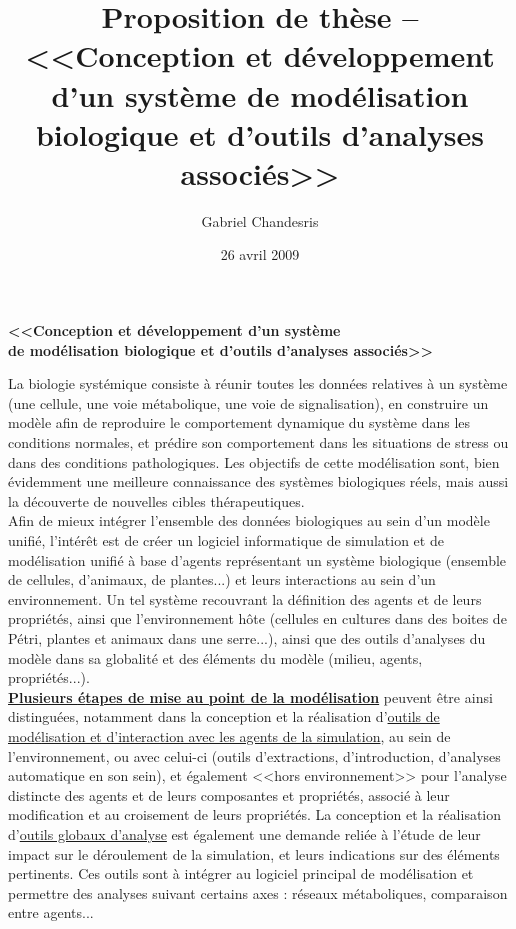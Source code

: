 \documentclass[11pt,twoside,a4paper]{article}
\author{Gabriel Chandesris}
\title{Proposition de th{\`e}se -- <<Conception et d{\'e}veloppement d'un syst{\`e}me de mod{\'e}lisation biologique et d'outils d'analyses associ{\'e}s>>}
\date{26 avril 2009}
\begin{document}
\begin{center}
\textbf{<<Conception et d{\'e}veloppement d'un syst{\`e}me~\\ de mod{\'e}lisation biologique et d'outils d'analyses associ{\'e}s>>}
\end{center}

La biologie syst{\'e}mique consiste {\`a} r{\'e}unir toutes les donn{\'e}es relatives {\`a} un syst{\`e}me (une cellule, une voie m{\'e}tabolique, une voie de signalisation), en construire un mod{\`e}le afin de reproduire le comportement dynamique du syst{\`e}me dans les conditions normales, et pr{\'e}dire son comportement dans les situations de stress ou dans des conditions pathologiques. Les objectifs de cette mod{\'e}lisation sont, bien {\'e}videmment une meilleure connaissance des syst{\`e}mes biologiques r{\'e}els, mais aussi la d{\'e}couverte de nouvelles cibles th{\'e}rapeutiques.~\\

Afin de mieux int{\'e}grer l'ensemble des donn{\'e}es biologiques au sein d'un mod{\`e}le unifi{\'e}, l'int{\'e}r{\^e}t est de cr{\'e}er un logiciel informatique de simulation et de mod{\'e}lisation unifi{\'e} {\`a} base d'agents repr{\'e}sentant un syst{\`e}me biologique (ensemble de cellules, d'animaux, de plantes...) et leurs interactions au  sein d'un environnement. Un tel syst{\`e}me recouvrant la d{\'e}finition des agents et de leurs propri{\'e}t{\'e}s, ainsi que l'environnement h{\^o}te (cellules en cultures dans des boites de P{\'e}tri, plantes et animaux dans une serre...), ainsi que des outils d'analyses du mod{\`e}le dans sa globalit{\'e} et des {\'e}l{\'e}ments du mod{\`e}le (milieu, agents, propri{\'e}t{\'e}s...).~\\

\textbf{\underline{Plusieurs {\'e}tapes de mise au point de la mod{\'e}lisation}} peuvent {\^e}tre ainsi distingu{\'e}es, notamment  dans la conception et la r{\'e}alisation d'\underline{outils de mod{\'e}lisation et d'interaction avec les agents de la simulation}, au sein de l'environnement, ou avec celui-ci (outils d'extractions,  d'introduction, d'analyses automatique en son sein), et {\'e}galement <<hors environnement>> pour l'analyse distincte des agents et de leurs composantes et propri{\'e}t{\'e}s, associ{\'e} {\`a} leur modification et au croisement de leurs propri{\'e}t{\'e}s. La conception et la r{\'e}alisation d'\underline{outils globaux d'analyse} est {\'e}galement une demande reli{\'e}e {\`a} l'{\'e}tude de leur impact sur le d{\'e}roulement de la simulation, et leurs indications sur des {\'e}l{\'e}ments pertinents. Ces outils sont {\`a} int{\'e}grer au logiciel principal de mod{\'e}lisation et permettre des analyses suivant certains axes : r{\'e}seaux m{\'e}taboliques, comparaison entre agents...~\\
\end{document}
